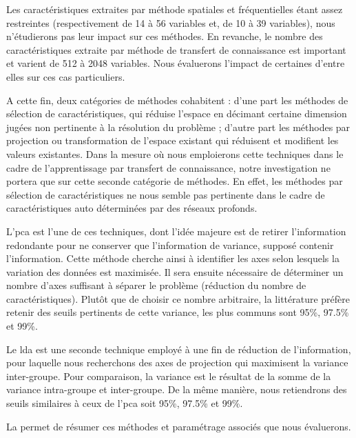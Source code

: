 Les caractéristiques extraites par méthode spatiales et fréquentielles étant assez restreintes (respectivement de 14 à 56 variables et, de 10 à 39 variables), nous n'étudierons pas leur impact sur ces méthodes. En revanche, le nombre des caractéristiques extraite par méthode de transfert de connaissance est important et varient de 512 à 2048 variables. Nous évaluerons l'impact de certaines d'entre elles sur ces cas particuliers.\par

A cette fin, deux catégories de méthodes cohabitent : d'une part les méthodes de sélection de caractéristiques, qui réduise l'espace en décimant certaine dimension jugées non pertinente à la résolution du problème ; d'autre part les méthodes par projection ou transformation de l'espace existant qui réduisent et modifient les valeurs existantes. Dans la mesure où nous emploierons cette techniques dans le cadre de l'apprentissage par transfert de connaissance, notre investigation ne portera que sur cette seconde catégorie de méthodes. En effet, les méthodes par sélection de caractéristiques ne nous semble pas pertinente dans le cadre de caractéristiques auto déterminées par des réseaux profonds.\par

L'\gls{pca} est l'une de ces techniques, dont l'idée majeure est de retirer l'information redondante pour ne conserver que l'information de variance, supposé contenir l'information. Cette méthode cherche ainsi à identifier les axes selon lesquels la variation des données est maximisée. Il sera ensuite nécessaire de déterminer un nombre d'axes suffisant à séparer le problème (réduction du nombre de caractéristiques). Plutôt que de choisir ce nombre arbitraire, la littérature préfère retenir des seuils pertinents de cette variance, les plus communs sont 95\%, 97.5\% et 99\%.\par

Le \gls{lda} est une seconde technique employé à une fin de réduction de l'information, pour laquelle nous recherchons des axes de projection qui maximisent la variance inter-groupe. Pour comparaison, la variance est le résultat de la somme de la variance intra-groupe et inter-groupe. De la même manière, nous retiendrons des seuils similaires à ceux de l'\gls{pca} soit 95\%, 97.5\% et 99\%.\par

La  permet de résumer ces méthodes et paramétrage associés que nous évaluerons.\par 

